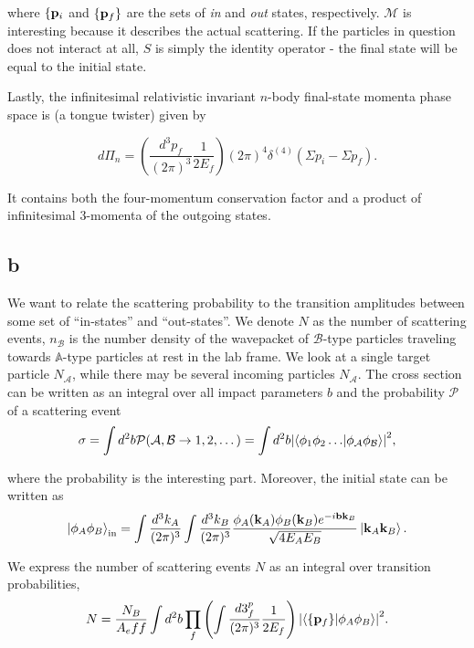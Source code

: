 \documentclass[11pt, a4paper]{amsart}
\begin{document}
where $\{\vb{p}_i$ and $\{\vb{p}_f\}$ are the sets of \emph{in} and \emph{out} states, respectively. $\mathcal{M}$ is interesting because it describes the actual scattering. If the particles in question does not interact at all, $S$ is simply the identity operator - the final state will be equal to the initial state.

Lastly, the infinitesimal relativistic invariant $n$-body final-state momenta phase space is (a tongue twister) given by

\begin{equation}
\label{eq:phasespace}
d\Pi_n = \left(\frac{d^3p_f}{(2\pi)^3} \frac{1}{2E_f}\right) (2\pi)^4 \delta^{(4)}(\Sigma p_i - \Sigma p_f).
\end{equation}

It contains both the four-momentum conservation factor and a product of infinitesimal 3-momenta of the outgoing states.

\subsection*{b}

We want to relate the scattering probability to the transition amplitudes between some set of ``in-states'' and ``out-states''. We denote $N$ as the number of scattering events, $n_\mathcal{B}$ is the number density of the wavepacket of $\mathcal{B}$-type particles traveling towards $\mathbb{A}$-type particles at rest in the lab frame. We look at a single target particle $N_\mathcal{A}$, while there may be several incoming particles $N_\mathcal{A}$. The cross section can be written as an integral over all impact parameters $b$ and the probability $\mathcal{P}$ of a scattering event
\begin{equation}
\sigma = \int d^2b \mathcal{P}(\mathcal{A}, \mathcal{B} \to 1, 2, \dots) = \int d^2b \abs{\braket{\phi_1\phi_2\dots}{\phi_\mathcal{A}\phi_\mathcal{B}}}^2,
\end{equation}

where the probability is the interesting part. Moreover,  the initial state can be written as
\begin{equation}
\ket{\phi_A\phi_B}_{\text{in}} = \int \frac{d^3 k_A}{(2\pi)^3} \int\frac{d^3k_B}{(2\pi)^3} \frac{\phi_A(\vb{k}_A)\phi_B(\vb{k}_B)e^{-i\vb{b}\vb{k}_B}}{\sqrt{4E_AE_B}} \ket{\vb{k}_A\vb{k}_B}.
\end{equation}

We express the number of scattering events $N$ as an integral over transition probabilities,
\begin{equation}
N = \frac{N_B}{A_eff} \int d^2b \prod_f \left( \int \frac{d3^p_f}{(2\pi)^3} \frac{1}{2E_f}\right) \abs{\braket{\{\vb{p}_f\}}{\phi_A\phi_B}}^2.
\end{equation}
\end{document}
